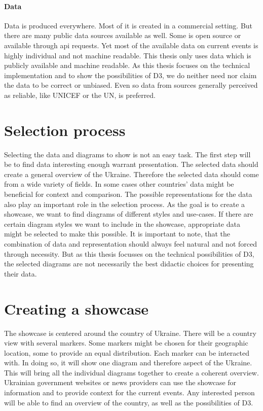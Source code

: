 \documentclass[
a4paper,     %
12pt         %
]{scrartcl}  %
\begin{document}
\paragraph{Data}
Data is produced everywhere. Most of it is created in a commercial setting. But there are many public data sources available as well. Some is open source or available through api requests. Yet most of the available data on current events is highly individual and not machine readable. This thesis only uses data which is publicly available and machine readable. As this thesis focuses on the technical implementation and to show the possibilities of D3, we do neither need nor claim the data to be correct or unbiased. Even so data from sources generally perceived as reliable, like UNICEF or the UN, is preferred.

\section{Selection process}
Selecting the data and diagrams to show is not an easy task. The first step will be to find data interesting enough warrant presentation. The selected data should create a general overview of the Ukraine. Therefore the selected data should come from a wide variety of fields. In some cases other countries' data might be beneficial for context and comparison. The possible representations for the data also play an important role in the selection process. As the goal is to create a showcase, we want to find diagrams of different styles and use-cases. If there are certain diagram styles we want to include in the showcase, appropriate data might be selected to make this possible. It is important to note, that the combination of data and representation should always feel natural and not forced through necessity. But as this thesis focusses on the technical possibilities of D3, the selected diagrams are not necessarily the best didactic choices for presenting their data.

\section{Creating a showcase}
The showcase is centered around the country of Ukraine. There will be a country view with several markers. Some markers might be chosen for their geographic location, some to provide an equal distribution. Each marker can be interacted with. In doing so, it will show one diagram and therefore aspect of the Ukraine.
This will bring all the individual diagrams together to create a coherent overview. Ukrainian government websites or news providers can use the showcase for information and to provide context for the current events. Any interested person will be able to find an overview of the country, as well as the possibilities of D3.
\end{document}
